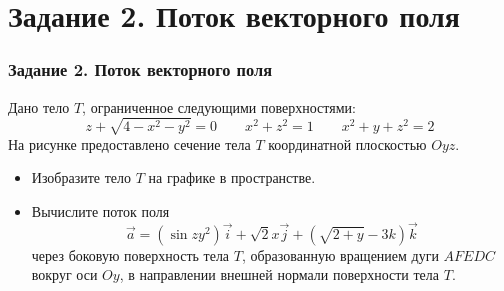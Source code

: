 \section{Задание 2. Поток векторного поля}
\begin{frame}
\frametitle{Задание 2. Поток векторного поля}
  Дано тело \(T\), ограниченное следующими поверхностями:
\begin{equation*}
  z + \sqrt{4 - x^2 - y^2} = 0 \qquad x^2+z^2 = 1 \qquad x^2 + y + z^2 = 2
\end{equation*}
На рисунке предоставлено сечение тела \(T\) координатной плоскостью \(Oyz\).

\begin{itemize}
  \item Изобразите тело \(T\) на графике в пространстве.
  \item Вычислите поток поля
  \begin{equation*}
    \vec a = (\sin zy^2) \vec i + \sqrt{2} x \vec j + (\sqrt{2+y} -3k) \vec k
  \end{equation*}
  через боковую поверхность тела \(T\), образованную вращением дуги \(AFEDC\) 
  вокруг оси \(Oy\), в направлении внешней нормали поверхности тела \(T\).
\end{itemize}

\end{frame}
